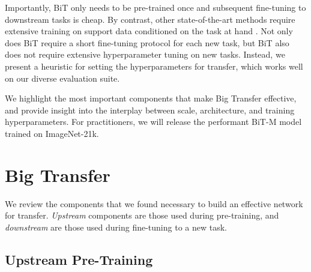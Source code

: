 \documentclass[runningheads]{llncs}
\newcommand{\name}{{BiT}}
\begin{document}
Importantly, \name{} only needs to be pre-trained once and subsequent fine-tuning to downstream tasks is cheap.
By contrast, other state-of-the-art methods require extensive training on support data conditioned on the task at hand \cite{dat,noisystudent,yalniz2019billion}.
Not only does \name{} require a short fine-tuning protocol for each new task, but \name{} also does not require extensive hyperparameter tuning on new tasks.
Instead, we present a heuristic for setting the hyperparameters for transfer, which works well on our diverse evaluation suite.

We highlight the most important components that make Big Transfer effective, and provide insight into the interplay between scale, architecture, and training hyperparameters.
For practitioners, we will release the performant \name-M model trained on ImageNet-21k.

\section{Big Transfer}
\label{sec:methods}

We review the components that we found necessary to build an effective network for transfer.
\emph{Upstream} components are those used during pre-training, and \emph{downstream} are those used during fine-tuning to a new task.


\subsection{Upstream Pre-Training}
\label{sec:methods_upstream}
\end{document}
